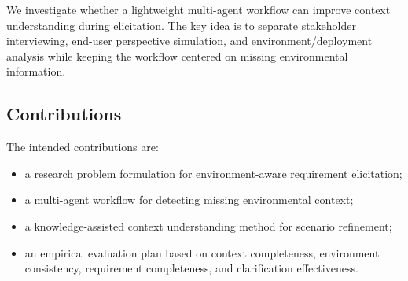 We investigate whether a lightweight multi-agent workflow can improve context understanding during elicitation.
The key idea is to separate stakeholder interviewing, end-user perspective simulation, and environment/deployment analysis while keeping the workflow centered on missing environmental information.

\subsection{Contributions}
\label{intro:contributions}

The intended contributions are:
\begin{itemize}[leftmargin=*]
  \item a research problem formulation for environment-aware requirement elicitation;
  \item a multi-agent workflow for detecting missing environmental context;
  \item a knowledge-assisted context understanding method for scenario refinement;
  \item an empirical evaluation plan based on context completeness, environment consistency, requirement completeness, and clarification effectiveness.
\end{itemize}
